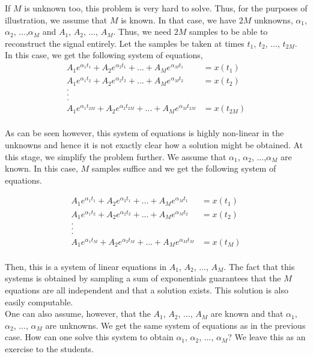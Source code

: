 If $M$ is unknown too, this problem is very hard to solve. Thus, for the purposes of illustration, we assume that $M$ is known. In that case, we have $2M$ unknowns, $\alpha_{1}$, $\alpha_{2}$, ...,$\alpha_{M}$ and $A_{1}$, $A_{2}$, ..., $A_{M}$. Thus, we need $2M$ samples to be able to reconstruct the signal entirely. Let the samples be taken at times $t_{1}$, $t_{2}$, ..., $t_{2M}$. In this case, we get the following system of equations,
\begin{align*}
    A_{1}e^{\alpha_{1} t_{1}} + A_{2}e^{\alpha_{2} t_{1}} + ... + A_{M}e^{\alpha_{M} t_{1}} &= x(t_{1})\\
    A_{1}e^{\alpha_{1} t_{2}} + A_{2}e^{\alpha_{2} t_{2}} + ... + A_{M}e^{\alpha_{M} t_{2}} &= x(t_{2})\\
.\\.\\.\\
    A_{1}e^{\alpha_{1} t_{2M}} + A_{2}e^{\alpha_{2} t_{2M}} + ... + A_{M}e^{\alpha_{M} t_{2M}} &= x(t_{2M})\\
\end{align*}

As can be seen however, this system of equations is highly non-linear in the unknowns and hence it is not exactly clear how a solution might be obtained. At this stage, we simplify the problem further. We assume that $\alpha_{1}$, $\alpha_{2}$, ...,$\alpha_{M}$ are known. In this case, $M$ samples suffice and we get the following system of equations.

\begin{align*}
    A_{1}e^{\alpha_{1} t_{1}} + A_{2}e^{\alpha_{2} t_{1}} + ... + A_{M}e^{\alpha_{M} t_{1}} &= x(t_{1})\\
    A_{1}e^{\alpha_{1} t_{2}} + A_{2}e^{\alpha_{2} t_{2}} + ... + A_{M}e^{\alpha_{M} t_{2}} &= x(t_{2})\\
.\\.\\.\\
    A_{1}e^{\alpha_{1} t_{M}} + A_{2}e^{\alpha_{2} t_{M}} + ... + A_{M}e^{\alpha_{M} t_{M}} &= x(t_{M})\\
\end{align*}

Then, this is a system of linear equations in $A_{1}$, $A_{2}$, ..., $A_{M}$. The fact that this systems is obtained by sampling a sum of exponentials guarantees that the $M$ equations are all independent and that a solution exists. This solution is also easily computable.\\

One can also assume, however, that the $A_{1}$, $A_{2}$, ..., $A_{M}$ are known and that $\alpha_{1}$, $\alpha_{2}$, ..., $\alpha_{M}$ are unknowns. We get the same system of equations as in the previous case. How can one solve this system to obtain $\alpha_{1}$, $\alpha_{2}$, ..., $\alpha_{M}$? We leave this as an exercise to the students. 

